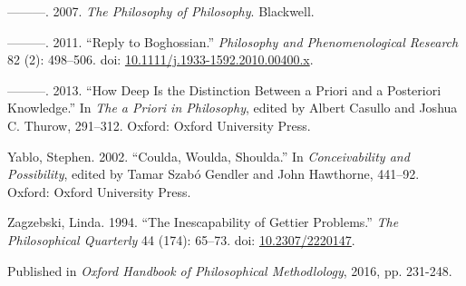 \documentclass[
  11pt,
  letterpaper,
  DIV=11,
  numbers=noendperiod,
  twoside]{scrartcl}
\newlength{\cslhangindent}
\newenvironment{CSLReferences}[2] %
 {\begin{list}{}{%
  \setlength{\itemindent}{0pt}
  \setlength{\leftmargin}{0pt}
  \setlength{\parsep}{0pt}
  \ifodd #1
   \setlength{\leftmargin}{\cslhangindent}
   \setlength{\itemindent}{-1\cslhangindent}
  \fi
  \setlength{\itemsep}{#2\baselineskip}}}
 {\end{list}}
\begin{document}
\begin{CSLReferences}{1}{0}
---------. 2007. \emph{{The Philosophy of Philosophy}}. Blackwell.

---------. 2011. {``Reply to Boghossian.''} \emph{Philosophy and
Phenomenological Research} 82 (2): 498--506. doi:
\href{https://doi.org/10.1111/j.1933-1592.2010.00400.x}{10.1111/j.1933-1592.2010.00400.x}.

---------. 2013. {``How Deep Is the Distinction Between a Priori and a
Posteriori Knowledge.''} In \emph{The a Priori in Philosophy}, edited by
Albert Casullo and Joshua C. Thurow, 291--312. Oxford: Oxford University
Press.

Yablo, Stephen. 2002. {``Coulda, Woulda, Shoulda.''} In
\emph{Conceivability and Possibility}, edited by Tamar Szabó Gendler and
John Hawthorne, 441--92. Oxford: Oxford University Press.

Zagzebski, Linda. 1994. {``The Inescapability of Gettier Problems.''}
\emph{The Philosophical Quarterly} 44 (174): 65--73. doi:
\href{https://doi.org/10.2307/2220147}{10.2307/2220147}.

\end{CSLReferences}



\noindent Published in\emph{
Oxford Handbook of Philosophical Methodlology}, 2016, pp. 231-248.
\end{document}
